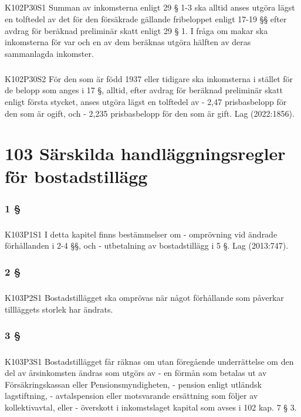 \documentclass[a4paper,notitlepage,openany,10pt]{book}
\begin{document}
\paragraph*{}
{\tiny K102P30S1}
Summan av inkomsterna enligt 29 § 1-3 ska alltid anses utgöra lägst en tolftedel av det för den försäkrade gällande fribeloppet enligt 17-19 §§ efter avdrag för beräknad preliminär skatt enligt 29 § 1. I fråga om makar ska inkomsterna för var och en av dem beräknas utgöra hälften av deras sammanlagda inkomster.
\paragraph*{}
{\tiny K102P30S2}
För den som är född 1937 eller tidigare ska inkomsterna i stället för de belopp som anges i 17 §, alltid, efter avdrag för beräknad preliminär skatt enligt första stycket, anses utgöra lägst en tolftedel av
\newline - 2,47 prisbasbelopp för den som är ogift, och
\newline - 2,235 prisbasbelopp för den som är gift.
Lag (2022:1856).
\chapter*{103 Särskilda handläggningsregler för bostadstillägg}
\subsection*{1 §}
\paragraph*{}
{\tiny K103P1S1}
I detta kapitel finns bestämmelser om
\newline - omprövning vid ändrade förhållanden i 2-4 §§, och
\newline - utbetalning av bostadstillägg i 5 §.
Lag (2013:747).
\subsection*{2 §}
\paragraph*{}
{\tiny K103P2S1}
Bostadstillägget ska omprövas när något förhållande som påverkar tillläggets storlek har ändrats.
\subsection*{3 §}
\paragraph*{}
{\tiny K103P3S1}
Bostadstillägget får räknas om utan föregående underrättelse om den del av årsinkomsten ändras som utgörs av
\newline - en förmån som betalas ut av Försäkringskassan eller Pensionsmyndigheten,
\newline - pension enligt utländsk lagstiftning,
\newline - avtalspension eller motsvarande ersättning som följer av kollektivavtal, eller
\newline - överskott i inkomstslaget kapital som avses i 102 kap. 7 § 3.
\end{document}

